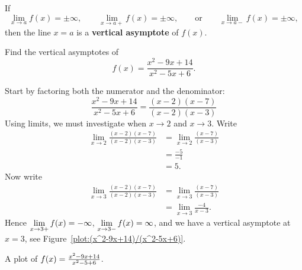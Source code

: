 \begin{definition}\label{def:vert asymptote}
If 
\[
\lim_{x\to a} f(x) = \pm\infty, \qquad \lim_{x\to a+} f(x) = \pm\infty, \qquad\text{or}\qquad \lim_{x\to a-} f(x) = \pm\infty,
\]
then the line $x=a$ is a \textbf{vertical asymptote} of $f(x)$.
\end{definition}


\begin{example}
Find the vertical asymptotes of 
\[
f(x) = \frac{x^2-9x+14}{x^2-5x+6}.
\]
\end{example}
\begin{solution}
Start by factoring both the numerator and the denominator:
\[
\frac{x^2-9x+14}{x^2-5x+6} = \frac{(x-2)(x-7)}{(x-2)(x-3)}
\]
Using limits, we must investigate when $x\to 2$ and $x\to 3$. Write
\begin{align*}
\lim_{x\to 2} \frac{(x-2)(x-7)}{(x-2)(x-3)} &= \lim_{x\to 2} \frac{(x-7)}{(x-3)}\\
&= \frac{-5}{-1}\\
&=5.
\end{align*}
Now write
\begin{align*}
\lim_{x\to 3} \frac{(x-2)(x-7)}{(x-2)(x-3)} &= \lim_{x\to 3} \frac{(x-7)}{(x-3)}\\
&= \lim_{x\to 3}\frac{-4}{x-3}.
\end{align*}
Hence $\displaystyle\lim_{x\to 3+} f(x) = -\infty$, $\displaystyle\lim_{x\to 3-} f(x) =
\infty$, and we have a vertical asymptote at $x=3$, see
Figure~\ref{plot:(x^2-9x+14)/(x^2-5x+6)}.
\end{solution}
\begin{marginfigure}[-4in]
\caption{A plot of $f(x)=\protect\frac{x^2-9x+14}{x^2-5+6}$.}
\label{plot:(x^2-9x+14)/(x^2-5x+6)}
\end{marginfigure}


